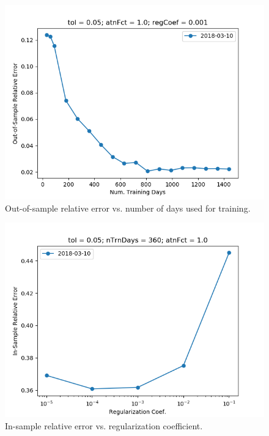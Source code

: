 \documentclass{article}
\begin{document}
\begin{figure}\label{fig:nTrnDays-sensitivity-oos-error}
\includegraphics[bb=0 0 640 480]{figures/nTrnDays-sensitivity-oos-error.png}
\caption{Out-of-sample relative error vs. number of days used for training.}
\end{figure}

\begin{figure}\label{fig:regCoef-sensitivity-error}
\includegraphics[bb=0 0 640 480]{figures/regCoef-sensitivity-error.png}
\caption{In-sample relative error vs. regularization coefficient.}
\end{figure}
\end{document}
